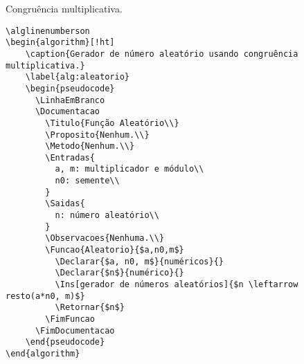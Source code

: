 \documentclass[a4paper,12pt,oneside,onecolumn]{article}
\begin{document}
\alglinenumbersoff
\begin{algorithm*}[!ht]
    \caption{Congruência multiplicativa.}
    \begin{pseudocode*}
            \LinhaEmBranco
            \Continuacao
                \Parar
              \Senao
              \FimSe
            \FimPara
          \FimPara
          \LinhaEmBranco
          \FimEnquanto
          \LinhaEmBranco
          \Repetir[comentário]
          \LinhaEmBranco
          \Fazer[comentário]
        \FimAlgoritmo
      \FimDocumentacao
    \end{pseudocode*}
\end{algorithm*}


\begin{verbatim}
\alglinenumberson
\begin{algorithm}[!ht]
    \caption{Gerador de número aleatório usando congruência multiplicativa.}
    \label{alg:aleatorio}
    \begin{pseudocode}
      \LinhaEmBranco
      \Documentacao
        \Titulo{Função Aleatório\\}
        \Proposito{Nenhum.\\}
        \Metodo{Nenhum.\\}
        \Entradas{
          a, m: multiplicador e módulo\\
          n0: semente\\
        }
        \Saidas{
          n: número aleatório\\
        }
        \Observacoes{Nenhuma.\\}
        \Funcao{Aleatorio}{$a,n0,m$}
          \Declarar{$a, n0, m$}{numéricos}{}
          \Declarar{$n$}{numérico}{}
          \Ins[gerador de números aleatórios]{$n \leftarrow resto(a*n0, m)$}
          \Retornar{$n$}
        \FimFuncao
      \FimDocumentacao
    \end{pseudocode}
\end{algorithm}
\end{verbatim}
\end{document}
